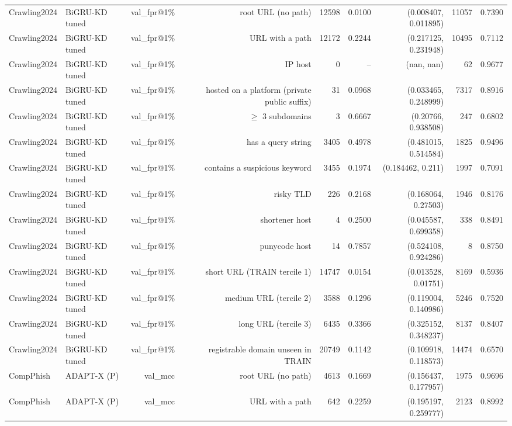 \begin{table}[t]
\begin{tabular}{llrrrrrrr}
Crawling2024 & BiGRU-KD tuned & val\_fpr@1\% & root URL (no path) & 12598 & 0.0100 & (0.008407, 0.011895) & 11057 & 0.7390 \\
Crawling2024 & BiGRU-KD tuned & val\_fpr@1\% & URL with a path & 12172 & 0.2244 & (0.217125, 0.231948) & 10495 & 0.7112 \\
Crawling2024 & BiGRU-KD tuned & val\_fpr@1\% & IP host & 0 & -- & (nan, nan) & 62 & 0.9677 \\
Crawling2024 & BiGRU-KD tuned & val\_fpr@1\% & hosted on a platform (private public suffix) & 31 & 0.0968 & (0.033465, 0.248999) & 7317 & 0.8916 \\
Crawling2024 & BiGRU-KD tuned & val\_fpr@1\% & $\geq$ 3 subdomains & 3 & 0.6667 & (0.20766, 0.938508) & 247 & 0.6802 \\
Crawling2024 & BiGRU-KD tuned & val\_fpr@1\% & has a query string & 3405 & 0.4978 & (0.481015, 0.514584) & 1825 & 0.9496 \\
Crawling2024 & BiGRU-KD tuned & val\_fpr@1\% & contains a suspicious keyword & 3455 & 0.1974 & (0.184462, 0.211) & 1997 & 0.7091 \\
Crawling2024 & BiGRU-KD tuned & val\_fpr@1\% & risky TLD & 226 & 0.2168 & (0.168064, 0.27503) & 1946 & 0.8176 \\
Crawling2024 & BiGRU-KD tuned & val\_fpr@1\% & shortener host & 4 & 0.2500 & (0.045587, 0.699358) & 338 & 0.8491 \\
Crawling2024 & BiGRU-KD tuned & val\_fpr@1\% & punycode host & 14 & 0.7857 & (0.524108, 0.924286) & 8 & 0.8750 \\
Crawling2024 & BiGRU-KD tuned & val\_fpr@1\% & short URL (TRAIN tercile 1) & 14747 & 0.0154 & (0.013528, 0.01751) & 8169 & 0.5936 \\
Crawling2024 & BiGRU-KD tuned & val\_fpr@1\% & medium URL (tercile 2) & 3588 & 0.1296 & (0.119004, 0.140986) & 5246 & 0.7520 \\
Crawling2024 & BiGRU-KD tuned & val\_fpr@1\% & long URL (tercile 3) & 6435 & 0.3366 & (0.325152, 0.348237) & 8137 & 0.8407 \\
Crawling2024 & BiGRU-KD tuned & val\_fpr@1\% & registrable domain unseen in TRAIN & 20749 & 0.1142 & (0.109918, 0.118573) & 14474 & 0.6570 \\
CompPhish & ADAPT-X (P) & val\_mcc & root URL (no path) & 4613 & 0.1669 & (0.156437, 0.177957) & 1975 & 0.9696 \\
CompPhish & ADAPT-X (P) & val\_mcc & URL with a path & 642 & 0.2259 & (0.195197, 0.259777) & 2123 & 0.8992 \\

\end{tabular}
\end{table}
